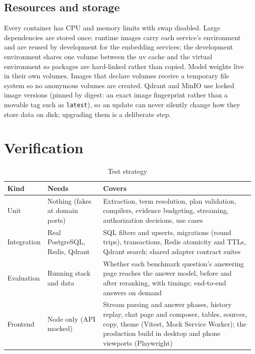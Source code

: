 \documentclass[11pt,letterpaper]{report}
\begin{document}
\section{Resources and storage}
Every container has CPU and memory limits with swap disabled. Large dependencies are stored once:
runtime images carry each service's environment and are reused by development for the embedding
services; the development environment shares one volume between the uv cache and the virtual
environment so packages are hard-linked rather than copied. Model weights live in their own volumes.
Images that declare volumes receive a temporary file system so no anonymous volumes are created.
Qdrant and MinIO use locked image versions (pinned by digest: an exact image fingerprint rather than a
movable tag such as \texttt{latest}), so an update can never silently change how they store data on disk;
upgrading them is a deliberate step.

\chapter{Verification}\label{ch:verification}
\begin{table}[H]
\centering
\caption{Test strategy}\label{tab:tests}
\begin{tabularx}{\textwidth}{@{}P{2.4cm}P{4.2cm}L@{}}
\toprule
\textbf{Kind} & \textbf{Needs} & \textbf{Covers} \\
\midrule
Unit & Nothing (fakes at domain ports) & Extraction, term resolution, plan validation, compilers, evidence budgeting, streaming, authorization decisions, use cases \\
Integration & Real PostgreSQL, Redis, Qdrant & SQL filters and upserts, migrations (round trips), transactions, Redis atomicity and TTLs, Qdrant search; shared adapter contract suites \\
Evaluation & Running stack and data & Whether each benchmark question's answering page reaches the answer model, before and after reranking, with timings; end-to-end answers on demand \\
Frontend & Node only (API mocked) & Stream parsing and answer phases, history replay, chat page and composer, tables, sources, copy, theme (Vitest, Mock Service Worker); the production build in desktop and phone viewports (Playwright) \\
\bottomrule
\end{tabularx}
\end{table}
\end{document}
